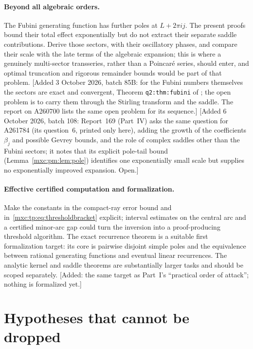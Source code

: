 \documentclass[11pt]{article}
\numberwithin{equation}{section}
\theoremstyle{definition}
\theoremstyle{remark}
\begin{document}
\paragraph{Beyond all algebraic orders.} The Fubini generating function
has further poles at $L+2\pi ij$. The present proofs bound their total
effect exponentially but do not extract their separate saddle
contributions. Derive those sectors, with their oscillatory phases, and
compare their scale with the late terms of the algebraic expansion; this
is where a genuinely multi-sector transseries, rather than a Poincar\'e
series, should enter, and optimal truncation and rigorous remainder
bounds would be part of that problem. [Added 3 October 2026, batch 85B:
for the Fubini numbers themselves the sectors are exact and convergent,
Theorem \texttt{q2:thm:fubini} of \cite{tsvol}; the open problem is to
carry them through the Stirling transform and the saddle. The report on
A260700 \cite{pdc} lists the same open problem for its sequence.]
[Added 6 October 2026, batch 108: Report~169 (Part~IV) asks the same
question for A261784 (its question~6, printed only here), adding the growth
of the coefficients $\beta_j$ and possible Gevrey bounds, and the role of
complex saddles other than the Fubini sectors; it notes that its explicit
pole-tail bound (Lemma~\ref{mxc:pm:lem:pole}) identifies one exponentially
small scale but supplies no exponentially improved expansion. Open.]

\paragraph{Effective certified computation and formalization.} Make the
constants in the compact-ray error bound and
in~\eqref{mxc:tp:eq:thresholdbracket} explicit; interval estimates on the
central arc and a certified minor-arc gap could turn the inversion into a
proof-producing threshold algorithm. The exact recurrence theorem is a
suitable first formalization target: its core is pairwise disjoint simple
poles and the equivalence between rational generating functions and
eventual linear recurrences. The analytic kernel and saddle theorems are
substantially larger tasks and should be scoped separately. [Added: the
same target as Part~I's ``practical order of attack''; nothing is
formalized yet.]

\section{Hypotheses that cannot be dropped}\label{mxc:tp:sec:audit}
\end{document}
